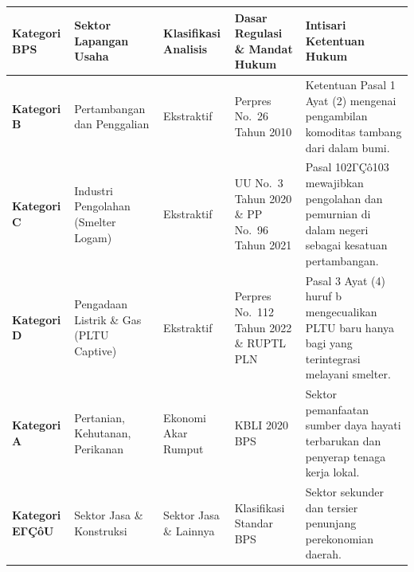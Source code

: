 \documentclass[
]{article}
\newcounter{none} %
\begin{document}
{\def\LTcaptype{none} %
\begin{longtable}[]{@{}
  >{\raggedright\arraybackslash}p{}
  >{\raggedright\arraybackslash}p{}
  >{\centering\arraybackslash}p{}
  >{\raggedright\arraybackslash}p{}
  >{\raggedright\arraybackslash}p{}@{}}
\toprule\noalign{}
\begin{minipage}[b]{\linewidth}\raggedright
Kategori BPS
\end{minipage} & \begin{minipage}[b]{\linewidth}\raggedright
Sektor Lapangan Usaha
\end{minipage} & \begin{minipage}[b]{\linewidth}\centering
Klasifikasi Analisis
\end{minipage} & \begin{minipage}[b]{\linewidth}\raggedright
Dasar Regulasi \& Mandat Hukum
\end{minipage} & \begin{minipage}[b]{\linewidth}\raggedright
Intisari Ketentuan Hukum
\end{minipage} \\
\midrule\noalign{}
\endhead
\bottomrule\noalign{}
\endlastfoot
\textbf{Kategori B} & Pertambangan dan Penggalian & Ekstraktif & Perpres
No.~26 Tahun 2010 & Ketentuan Pasal 1 Ayat (2) mengenai pengambilan
komoditas tambang dari dalam bumi. \\
\textbf{Kategori C} & Industri Pengolahan (Smelter Logam) & Ekstraktif &
UU No.~3 Tahun 2020 \& PP No.~96 Tahun 2021 & Pasal 102ΓÇô103 mewajibkan
pengolahan dan pemurnian di dalam negeri sebagai kesatuan
pertambangan. \\
\textbf{Kategori D} & Pengadaan Listrik \& Gas (PLTU Captive) &
Ekstraktif & Perpres No.~112 Tahun 2022 \& RUPTL PLN & Pasal 3 Ayat (4)
huruf b mengecualikan PLTU baru hanya bagi yang terintegrasi melayani
smelter. \\
\textbf{Kategori A} & Pertanian, Kehutanan, Perikanan & Ekonomi Akar
Rumput & KBLI 2020 BPS & Sektor pemanfaatan sumber daya hayati
terbarukan dan penyerap tenaga kerja lokal. \\
\textbf{Kategori EΓÇôU} & 13 Sektor Jasa \& Konstruksi & Sektor Jasa \&
Lainnya & Klasifikasi Standar BPS & Sektor sekunder dan tersier
penunjang perekonomian daerah. \\
\end{longtable}
}
\end{document}
